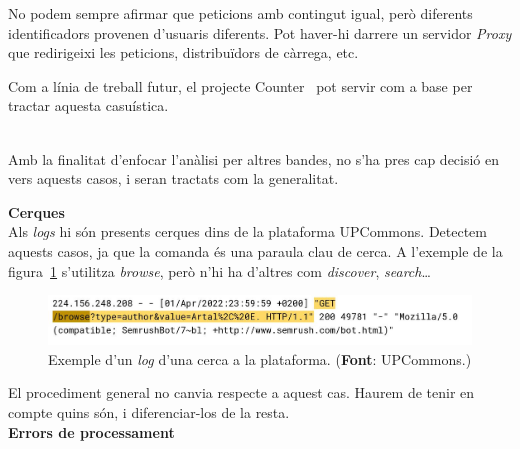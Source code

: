 \begin{tcolorbox}[colback=green!5!white, colframe=green!50!black, title=Divergència relativa]
    No podem sempre afirmar que peticions amb contingut igual, però diferents identificadors provenen d'usuaris diferents.
    Pot haver-hi darrere un servidor \textit{Proxy} que redirigeixi les peticions, distribuïdors de càrrega, etc.
\end{tcolorbox}

\noindent
\begin{tcolorbox}[colback=blue!5!white, colframe=blue!75!black, title=Counter]
    Com a línia de treball futur, el projecte Counter~\cite{counter} pot servir com a base per tractar aquesta casuística.
\end{tcolorbox}

\noindent \\
Amb la finalitat d'enfocar l'anàlisi per altres bandes, no s'ha pres cap decisió en vers aquests casos, i seran tractats com la generalitat.

\clearpage

\noindent
\textbf{Cerques} \\

\noindent
Als \textit{\gls{log}s} hi són presents cerques dins de la plataforma \gls{UPCommons}.
Detectem aquests casos, ja que la comanda és una paraula clau de cerca.
A l'exemple de la figura~\ref{fig:log-search} s'utilitza \textit{browse}, però n'hi ha d'altres com \textit{discover}, \textit{search}\dots \\

\begin{figure}[htbp]
    \centerline{\includegraphics[width=\textwidth]{figures/log-search}}
    \captionsetup{justification=centering}
    \caption[Exemple d'un \textit{\gls{log}} d'una cerca a la plataforma.]{Exemple d'un \textit{\gls{log}} d'una cerca a la plataforma. (\textbf{Font}: \gls{UPCommons}.)}\label{fig:log-search}
\end{figure}

\noindent
El procediment general no canvia respecte a aquest cas.
Haurem de tenir en compte quins són, i diferenciar-los de la resta. \\

\noindent
\textbf{Errors de processament}\label{subsubsection:log-errors} \\

